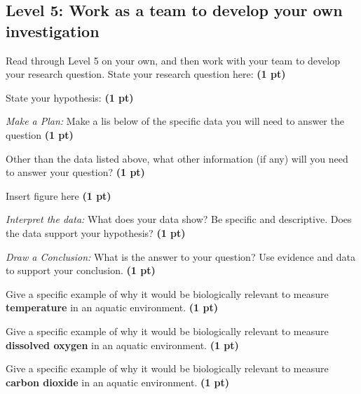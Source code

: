 \documentclass[12pt,letterpaper]{article}
\begin{document}
\subsection*{Level 5: Work as a team to develop your own investigation}
\begin{enumerate}[font=\bfseries, wide, resume]
    {\color{under}\item Read through Level 5 on your own, and then work with your team to develop your research question. State your research question here: \textbf{(1 pt)}}
    {\color{under}\item State your hypothesis: \textbf{(1 pt)}}
    {\color{under}\item \textit{Make a Plan:} Make a lis below of the specific data you will need to answer the question \textbf{(1 pt)} }
    {\color{under}\item Other than the data listed above, what other information (if any) will you need to answer your question? \textbf{(1 pt)}}
    {\color{under}\item Insert figure here \textbf{(1 pt)}}
    {\color{under}\item \textit{Interpret the data:} What does your data show? Be specific and descriptive. Does the data support your hypothesis? \textbf{(1 pt)}}
    {\color{under}\item \textit{Draw a Conclusion:} What is the answer to your question? Use evidence and data to support your conclusion. \textbf{(1 pt)}}
    {\color{under}\item Give a specific example of why it would be biologically relevant to measure \textbf{temperature} in an aquatic environment. \textbf{(1 pt)}}
    {\color{under}\item Give a specific example of why it would be biologically relevant to measure \textbf{dissolved oxygen} in an aquatic environment. \textbf{(1 pt)}}
    {\color{under}\item Give a specific example of why it would be biologically relevant to measure \textbf{carbon dioxide} in an aquatic environment. \textbf{(1 pt)}}
\end{enumerate}
\end{document}
